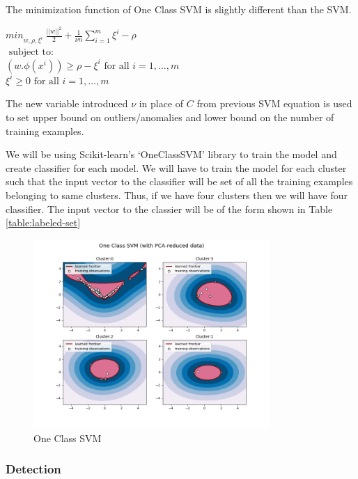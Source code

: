 \documentclass[10pt,oneside,a4paper]{article}
\begin{document}
The minimization function of One Class SVM is slightly different than the SVM. \cite{SVM}

\begin{center}
  ${min}_{w,\rho,\xi^i} \ \frac{||w||^2}{2} + \frac{1}{\nu n} \sum_{i=1}^m \xi^i - \rho$ \\
  $\mbox{ subject to: }$ \\
  $(w.\phi(x^i)) \geq \rho - \xi^i \mbox{ for all } i = 1, \dots, m$ \\
  \hspace{2cm} $\xi^i \geq 0 \mbox{ for all } i = 1, \dots, m$ \\
\end{center}

The new variable introduced $\nu$ in place of $C$ from previous SVM equation is used to set upper bound on outliers/anomalies and lower bound on the number of training examples.

We will be using Scikit-learn's `OneClassSVM' library to train the model and create classifier for each model. We will have to train the model for each cluster such that the input vector to the classifier will be set of all the training examples belonging to same clusters. Thus, if we have four clusters then we will have four classifier. The input vector to the classier will be of the form shown in Table \ref{table:labeled-set}

\begin{figure}[H]
\centering
\includegraphics[width=0.80\textwidth]{one-class-SVM}
\caption{One Class SVM} \label{fig:one-class-SVM}
\end{figure}


\subsubsection{Detection}
\end{document}
